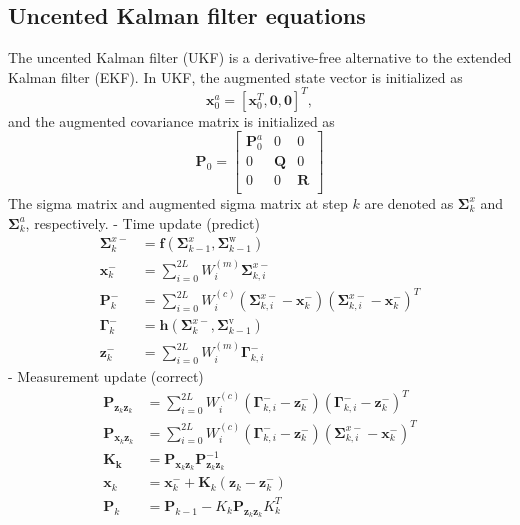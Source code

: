 \documentclass[12pt]{article}
\begin{document}
\subsection{Uncented Kalman filter equations}

The uncented Kalman filter (UKF) is a derivative-free alternative to the extended Kalman filter (EKF). In UKF, the augmented state vector is initialized as
%
\begin{equation}
	\mathbf{x}^a_0 = [\mathbf{x}^T_0, \mathbf{0}, \mathbf{0}]^T, 
\end{equation}
%
and the augmented covariance matrix is initialized as
%
\begin{equation} \label{eq:UK_aug}
	\mathbf{P}_0 = \begin{bmatrix}
	\mathbf{P}^a_0 & 0 & 0 \\
	0 & \mathbf{Q} & 0 \\
	0 & 0 & \mathbf{R} \\ 
	\end{bmatrix}
\end{equation}
%
The sigma matrix and augmented sigma matrix at step $k$ are denoted as \(\mathbf{\Sigma}_k^x\) and \(\mathbf{\Sigma}_k^a\), respectively.
%
- Time update (predict)
%
\begin{align}
	\mathbf{\Sigma}_k^{x-} &= \mathbf{f}( \mathbf{\Sigma}^x_{k-1}, \mathbf{\Sigma}^\text{w}_{k-1}) \label{eq:UK_pre1} \\
	\mathbf{x}_k^{-} &= \sum_{i=0}^{2L}{W_i^{(m)}\mathbf{\Sigma}^{x-}_{k,i}} 	\\		
	\mathbf{P}_{k}^{-} &= \sum_{i=0}^{2L}{W_i^{(c)}(\mathbf{\Sigma}^{x-}_{k,i} - 		\mathbf{x}_k^{-})(\mathbf{\Sigma}^{x-}_{k,i} - \mathbf{x}_k^{-})^T} \label{eq:UK_pre3} \\
	\mathbf{\Gamma}_k^- &= \mathbf{h}(\mathbf{\Sigma}_k^{x-}, \mathbf{\Sigma}^\text{v}_{k-1}) \label{eq:UK_pre4} \\ 
	\mathbf{z}_k^{-} &= \sum_{i=0}^{2L}{W_i^{(m)}\mathbf{\Gamma}^{-}_{k,i}}
\end{align}
%
- Measurement update (correct)
%
\begin{align}
	\mathbf{P}_{\mathbf{z}_k \mathbf{z}_k} &= \sum_{i=0}^{2L}{W_i^{(c)}(\mathbf{\Gamma}^{-}_{k,i} - \mathbf{z}_k^{-})(\mathbf{\Gamma}^{-}_{k,i} - \mathbf{z}_k^{-})^T} \label{eq:UK_cor1} \\
	\mathbf{P}_{\mathbf{x}_k \mathbf{z}_k} &= \sum_{i=0}^{2L}{W_i^{(c)}(\mathbf{\Gamma}^{-}_{k,i} - 		\mathbf{z}_k^{-})(\mathbf{\Sigma}^{x-}_{k,i} - \mathbf{x}_k^{-})^T} \\
	\mathbf{K_k} &= \mathbf{P}_{\mathbf{x}_k \mathbf{z}_k}\mathbf{P}_{\mathbf{z}_k \mathbf{z}_k}^{-1} \\
	\mathbf{x}_{k} &= \mathbf{x}_{k}^{-} + \mathbf{K}_{k}( \mathbf{z}_k - \mathbf{z}^-_k) \\
	\mathbf{P}_k &= \mathbf{P}_{k-1} - K_k\mathbf{P}_{\mathbf{z}_k \mathbf{z}_k}K_k^T
\end{align}
\end{document}
